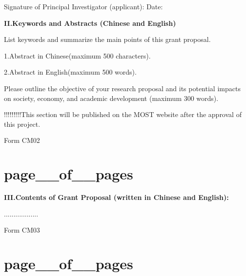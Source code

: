 \documentclass[12pt, a4paper]{article}
\begin{document}
Signature of Principal Investigator (applicant):                 Date:

\textbf{II.Keywords and Abstracts (Chinese and English)}

  List keywords and summarize the main points of this grant proposal.

  1.Abstract in Chinese(maximum 500 characters).

  2.Abstract in English(maximum 500 words).

  Please outline the objective of your research proposal and its potential impacts on society, economy, and academic development (maximum 300 words).


!!!!!!!!!This section will be published on the MOST website after the approval of this project.

  Form CM02
  \section{page__of__pages}


\textbf{III.Contents of Grant Proposal (written in Chinese and English):}

  ..................




  Form CM03

  \section{page__of__pages}
\end{document}

